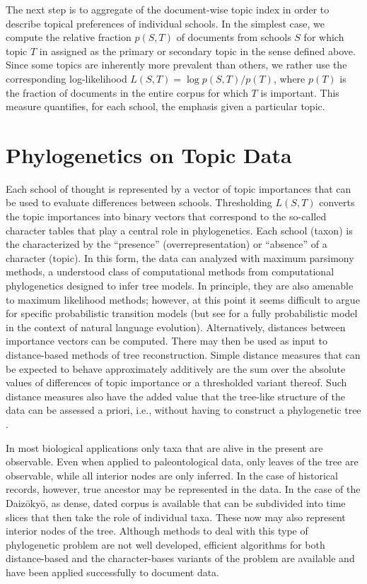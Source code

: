 \documentclass[a4paper,10pt]{article}
\begin{document}
The next step is to aggregate of the document-wise topic index in order to
describe topical preferences of individual schools.  In the simplest case,
we compute the relative fraction $p(S,T)$ of documents from schools $S$ for
which topic $T$ in assigned as the primary or secondary topic in the sense
defined above.  Since some topics are inherently more prevalent than
others, we rather use the corresponding log-likelihood $L(S,T) = \log
p(S,T)/p(T)$, where $p(T)$ is the fraction of documents in the entire
corpus for which $T$ is important. This measure quantifies, for each
school, the emphasis given a particular topic.

\section{Phylogenetics on Topic Data} 

Each school of thought is represented by a vector of topic importances that
can be used to evaluate differences between schools. Thresholding $L(S,T)$
converts the topic importances into binary vectors that correspond to the
so-called character tables that play a central role in phylogenetics. Each
school (taxon) is the characterized by the ``presence''
(overrepresentation) or ``absence'' of a character (topic).  In this form,
the data can analyzed with maximum parsimony methods, a understood class of
computational methods from computational phylogenetics designed to infer
tree models. In principle, they are also amenable to maximum likelihood
methods; however, at this point it seems difficult to argue for specific
probabilistic transition models (but see \cite{Hruschka:15} for a fully
probabilistic model in the context of natural language
evolution). Alternatively, distances between importance vectors can be
computed. There may then be used as input to distance-based methods of tree
reconstruction. Simple distance measures that can be expected to behave
approximately additively are the sum over the absolute values of
differences of topic importance or a thresholded variant thereof. Such
distance measures also have the added value that the tree-like structure of
the data can be assessed a priori, i.e., without having to construct a
phylogenetic tree \cite{Misof:14}.

In most biological applications only taxa that are alive in the present are
observable. Even when applied to paleontological data, only leaves of the
tree are observable, while all interior nodes are only inferred. In the
case of historical records, however, true ancestor may be represented in
the data. In the case of the Daiz{\=o}ky{\=o}, as dense, dated corpus is
available that can be subdivided into time slices that then take the role
of individual taxa. These now may also represent interior nodes of the
tree. Although methods to deal with this type of phylogenetic problem are
not well developed, efficient algorithms for both distance-based and the
character-bases variants of the problem are available \cite{Telles:13} and
have been applied successfully to document data. 
\end{document}
